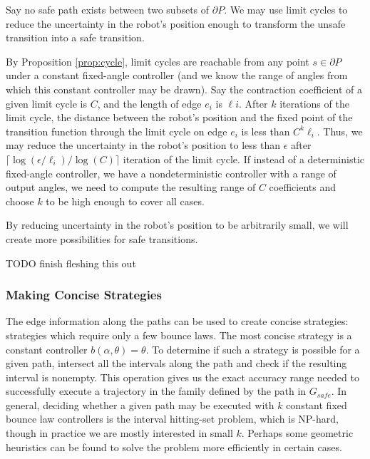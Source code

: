 \documentclass[]{styles/svproc}  %
\begin{document}
Say no safe path exists between two subsets of $\partial P$. We may
use limit cycles to reduce the uncertainty in the robot's position enough to
transform the unsafe transition into a safe transition.


By Proposition \ref{prop:cycle}, limit cycles are reachable from any point $s
\in \partial P$ under a constant fixed-angle controller (and we know the range
of angles from which this constant controller may be drawn). Say the contraction 
coefficient of a given limit cycle is $C$, and the length of edge $e_i$ is $\ell
i$. After $k$ iterations of the limit cycle,
the distance between the robot's position and the fixed point of the transition
function through the limit cycle on edge $e_i$ is less than $C^k \ell_i$. Thus,
we may reduce the uncertainty in the robot's position to less than $\epsilon$
after $\lceil \log(\epsilon/\ell_i)/\log(C) \rceil$ iteration of the limit
cycle. If instead of a deterministic fixed-angle controller, we have a
nondeterministic controller with a range of output angles, we need to
compute the resulting range of $C$ coefficients and choose $k$ to be high enough
to cover all cases.

By reducing uncertainty in the robot's position to be arbitrarily small, we will
create more possibilities for safe transitions. 

{\color{red} TODO finish fleshing this out}

\subsubsection{Making Concise Strategies}

The edge
information along the paths can be used to create concise strategies:
strategies which require only a few bounce laws. The most concise strategy is
a constant controller $b(\alpha,
\theta) = \theta$. To determine if such a strategy is possible for a given path, 
intersect all the intervals along the path and check if the
resulting interval is nonempty. This operation gives us the exact
accuracy range needed to successfully execute a trajectory in the family defined
by the path in $G_{safe}$. In general, deciding whether a given path may be
executed with $k$ constant fixed bounce law controllers is the interval
hitting-set problem, which is NP-hard, though in practice we are mostly
interested in small $k$. Perhaps some geometric heuristics can be found to solve
the problem more efficiently in certain cases.
\end{document}
